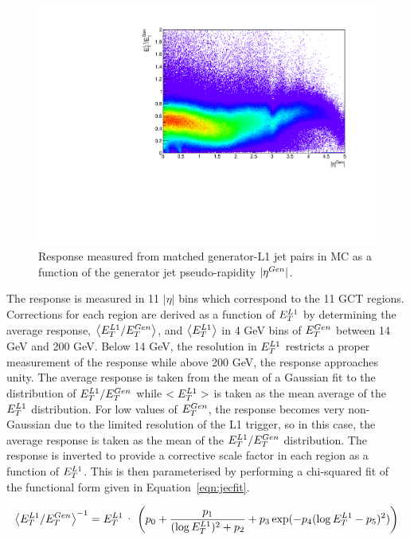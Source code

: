 \begin{figure}
\begin{center}
\includegraphics[width=.8\textwidth]{detector/l1jet/bias.pdf}
\caption{Response measured from matched generator-L1 jet pairs in MC 
	as a function of the generator jet pseudo-rapidity $|\eta^{Gen}|$.}
\label{fig:respvseta}
\end{center}
\end{figure}

The response is measured in 11 $|\eta|$ bins which correspond to the 11 GCT regions.
Corrections for each region are derived as a function of $E_{T}^{L1}$ by determining 
the average response, $\left<E_{T}^{L1}/E_{T}^{Gen}\right>$, and $\left<E_{T}^{L1}\right>$
in 4 GeV bins of $E_{T}^{Gen}$ between 14 GeV and 200 GeV. Below 14 GeV, the resolution in $E_{T}^{L1}$ restricts
a proper measurement of the response while above 200 GeV, the response approaches unity.
The average response is taken from the mean of a 
Gaussian fit to the distribution of $E_{T}^{L1}/E_{T}^{Gen}$ while $<E_{T}^{L1}>$ is taken as the mean 
average of the $E_{T}^{L1}$ distribution. For low values of $E_{T}^{Gen}$, the response becomes very non-Gaussian
due to the limited resolution of the L1 trigger, so in this case, the average response is taken
as the mean of the $E_{T}^{L1}/E_{T}^{Gen}$ distribution. The response is inverted to provide a
corrective scale factor in each region as a function of $E_{T}^{L1}$. This is then parameterised 
by performing a chi-squared fit of the functional form given in Equation~\ref{eqn:jecfit}.

\begin{equation}
\left<\Lonept/\Genpt\right>^{-1} = \Lonept \cdot \left ( p_{0} + 
\frac{p_{1}}{(\log \Lonept)^{2}+p_{2}}+p_{3} \exp(-p_{4}
(\log \Lonept-p_{5} ) ^{2}) \right )
\label{eqn:jecfit}
\end{equation}


